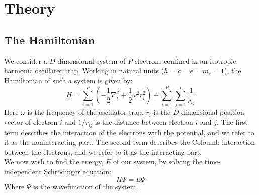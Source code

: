 \documentclass[a4paper, 10pt]{article}
\begin{document}
	\section{Theory}
	\subsection{The Hamiltonian}
	We consider a $D$-dimensional system of $P$ electrons confined in an isotropic harmonic oscillator trap. Working in natural units ($\hbar=c=e=m_e=1$), the Hamiltonian of such a system is given by:
	\begin{equation}\label{eq:Hamiltonian}
	H=\sum_{i=1}^P \left(-\frac{1}{2}\nabla_i^2 +\frac{1}{2}\omega^2 r_i^2\right)+\sum_{i=1}^P \sum_{j=1}^{i}\frac{1}{r_{ij}}
	\end{equation}
	Here $\omega$ is the frequency of the oscillator trap, $r_{i}$ is the $D$-dimensional position vector of electron $i$ and $1/r_{ij}$ is the distance between electron $i$ and $j$. The first term describes the interaction of the electrons with the potential, and we refer to it as the noninteracting part. The second term describes the Coloumb interaction between the electrons, and we refer to it as the interacting part.\\
	\linebreak
	We now wish to find the energy, $E$ of our system, by solving the time-independent Schrödinger equation:
	\begin{equation}\label{eq:time_depenedent_schrodinger}
	H\Psi = E\Psi
	\end{equation}
	Where $\Psi$ is the wavefunction of the system.
\end{document}
